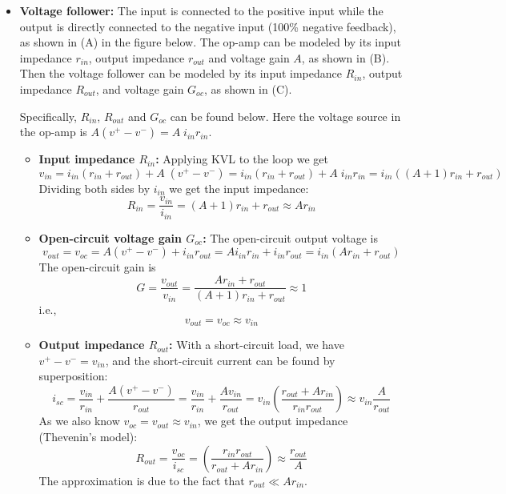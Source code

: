 \begin{itemize}

\item {\bf Voltage follower:} The input is connected to the positive 
  input while the output is directly connected to the negative input 
  (100\% negative feedback), as shown in (A) in the figure below. The 
  op-amp can be modeled by its input impedance $r_{in}$, output impedance 
  $r_{out}$ and voltage gain $A$, as shown in (B). Then the voltage follower 
  can be modeled by its input impedance $R_{in}$, output impedance $R_{out}$,
  and voltage gain $G_{oc}$, as shown in (C). 

  
  Specifically, $R_{in}$, $R_{out}$ and $G_{oc}$ can be found below. Here 
  the voltage source in the op-amp is $A(v^+-v^-)=A \;i_{in} r_{in}$.
  
  \begin{itemize}
  \item {\bf Input impedance $R_{in}$:} Applying KVL to the loop we get
    \[
    v_{in}=i_{in}(r_{in}+r_{out})+A\;(v^+-v^-)
    =i_{in}(r_{in}+r_{out})+A\;i_{in}r_{in}
    =i_{in}((A+1)r_{in}+r_{out})
    \]
    Dividing both sides by $i_{in}$ we get the input impedance:
    \[
    R_{in}=\frac{v_{in}}{i_{in}}=(A+1)r_{in}+r_{out} \approx Ar_{in}
    \]
  \item {\bf Open-circuit voltage gain $G_{oc}$:} The open-circuit output 
    voltage is
    \[
    v_{out}=v_{oc}=A(v^+-v^-)+i_{in}r_{out}=Ai_{in}r_{in}+i_{in}r_{out}
    =i_{in}(Ar_{in}+r_{out})
    \]
    The open-circuit gain is
    \[
    G=\frac{v_{out}}{v_{in}}=\frac{Ar_{in}+r_{out}}{(A+1)r_{in}+r_{out}}\approx 1
    \]
    i.e., 
    \[
    v_{out}=v_{oc}\approx v_{in}
    \]
  \item {\bf Output impedance $R_{out}$:} 
    With a short-circuit load, we have $v^+-v^-=v_{in}$, and the 
    short-circuit current can be found by superposition:
    \[
    i_{sc}=\frac{v_{in}}{r_{in}}+\frac{A(v^+-v^-)}{r_{out}}
    =\frac{v_{in}}{r_{in}}+\frac{Av_{in}}{r_{out}}
    =v_{in}\left(\frac{r_{out}+Ar_{in}}{r_{in}r_{out}}\right)
    \approx v_{in}\frac{A}{r_{out}}
    \]
    As we also know $v_{oc}=v_{out}\approx v_{in}$, we get the output impedance
    (Thevenin's model):
    \[
    R_{out}=\frac{v_{oc}}{i_{sc}}=\left(\frac{r_{in}r_{out}}{r_{out}+Ar_{in}}\right)
    \approx \frac{r_{out}}{A}
    \]
    The approximation is due to the fact that $r_{out}\ll Ar_{in}$.
  \end{itemize}


\end{itemize}
